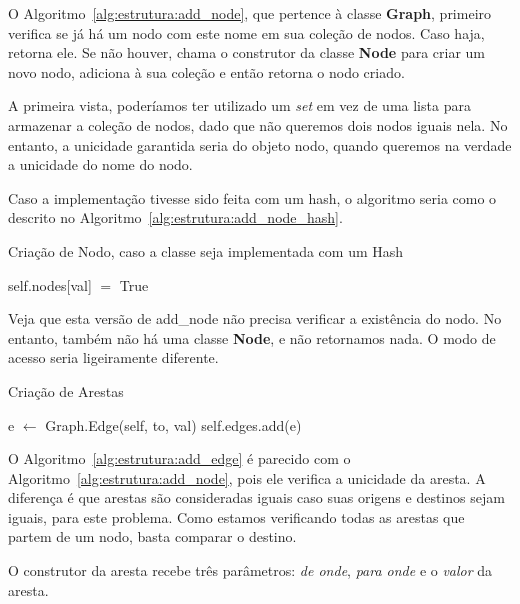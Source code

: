 \documentclass[12pt]{article}
\begin{document}
O Algoritmo~\ref{alg:estrutura:add_node},
que pertence à classe \textsf{\textbf{Graph}}, primeiro verifica se já há um
nodo com este nome em sua coleção de nodos. Caso haja, retorna ele. Se não
houver, chama o construtor da classe \textsf{\textbf{Node}} para criar um novo
nodo, adiciona à sua coleção e então retorna o nodo criado.

A primeira vista, poderíamos ter utilizado um \textit{set} em vez de uma lista
para armazenar a coleção de nodos, dado que não queremos dois nodos iguais nela.
No entanto, a unicidade garantida seria do objeto nodo, quando queremos na
verdade a unicidade do nome do nodo.

Caso a implementação tivesse sido feita com um hash, o algoritmo seria como o
descrito no Algoritmo~\ref{alg:estrutura:add_node_hash}.

\begin{algorithm}[H]
  \caption{Criação de Nodo, caso a classe seja implementada com um Hash}
  \label{alg:estrutura:add_node_hash}
  self.nodes[val] $=$ True
\end{algorithm}

Veja que esta versão de \textsf{add\_node} não precisa verificar a existência do
nodo. No entanto, também não há uma classe \textsf{\textbf{Node}}, e não
retornamos nada. O modo de acesso seria ligeiramente diferente.

\begin{algorithm}[H]
  \caption{Criação de Arestas}
  \label{alg:estrutura:add_edge}
  {
    {
       
    }
    e $\gets$ Graph.Edge(self, to, val) 
    self.edges.add(e) 
  }
\end{algorithm}

O Algoritmo~\ref{alg:estrutura:add_edge} é
parecido com o Algoritmo~\ref{alg:estrutura:add_node}, pois ele verifica a unicidade da
aresta. A diferença é que arestas são consideradas iguais caso suas origens e
destinos sejam iguais, para este problema. Como estamos verificando todas as
arestas que partem de um nodo, basta comparar o destino.

O construtor da aresta recebe três parâmetros: \textit{de onde}, \textit{para
  onde} e o \textit{valor} da aresta.
\end{document}
